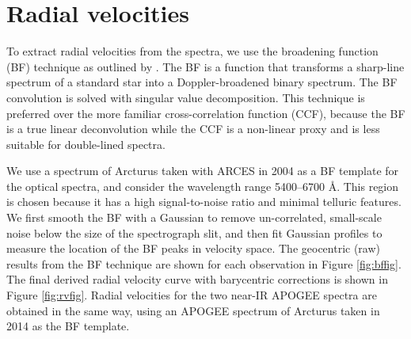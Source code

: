 \section{Radial velocities}\label{rvs}
To extract radial velocities from the spectra, we use the broadening function (BF) technique as outlined by \citet{ruc02}. The BF is a function that transforms a sharp-line spectrum of a standard star into a Doppler-broadened binary spectrum. The BF convolution is solved with singular value decomposition. This technique is preferred over the more familiar cross-correlation function (CCF), because the BF is a true linear deconvolution while the CCF is a non-linear proxy and is less suitable for double-lined spectra.

We use a spectrum of Arcturus taken with ARCES in 2004 as a BF template for the optical spectra, and consider the wavelength range 5400--6700 \AA. This region is chosen because it has a high signal-to-noise ratio and minimal telluric features. We first smooth the BF with a Gaussian to remove un-correlated, small-scale noise below the size of the spectrograph slit, and then fit Gaussian profiles to measure the location of the BF peaks in velocity space. The geocentric (raw) results from the BF technique are shown for each observation in Figure \ref{fig:bffig}. The final derived radial velocity curve with barycentric corrections is shown in Figure \ref{fig:rvfig}. Radial velocities for the two near-IR APOGEE spectra are obtained in the same way, using an APOGEE spectrum of Arcturus taken in 2014 as the BF template.

